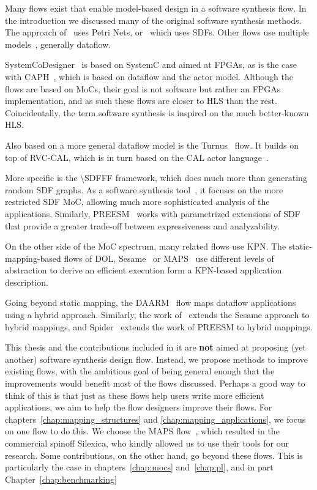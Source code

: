 Many flows exist that enable model-based design in a software synthesis flow.
In the introduction we discussed many of the original software synthesis methods.
The approach of~\cite{lin1998softwaresynthesis} uses Petri Nets, or~\cite{ritz1992softwaresynthesis} which uses \acp{SDF}.
Other flows use multiple models~\cite{bhartacharyya2000softwaresynthesis,pino1995softwaresynthesis,bhattacharyya2012softwaresynthesis}, generally dataflow.

SystemCoDesigner~\cite{haubelt2008systemcodesigner} is based on SystemC and aimed at \acsp{FPGA}, as is the case with CAPH~\cite{serot2013caph}, which is based on dataflow and the actor model.
Although the flows are based on \acp{MoC}, their goal is not software but rather an \acsp{FPGA} implementation, and as such these flows are closer to \ac{HLS} than the rest. 
Coincidentally, the term software synthesis is inspired on the much better-known \ac{HLS}.

Also based on a more general dataflow model is the Turnus~\cite{casale2013turnus} flow.
It builds on top of RVC-CAL, which is in turn based on the CAL actor language~\cite{cal}.

More specific is the \ac{\SDFFF}\cite{sdf3} framework, which does much more than generating random \ac{SDF} graphs.
As a software synthesis tool~\cite{stuijk2010predictable}, it focuses on the more restricted \ac{SDF} \ac{MoC}, allowing much more sophisticated analysis of the applications.
Similarly, PREESM~\cite{pelcat2014preesm} works with parametrized extensions of \ac{SDF}~\cite{desnos2013pimm} that provide a greater trade-off between expressiveness and analyzability.

On the other side of the \ac{MoC} spectrum, many related flows use \ac{KPN}.
The static-mapping-based flows of \ac{DOL}\cite{thiele2007dol}, Sesame~\cite{pimentel2006systematic} or \ac{MAPS}~\cite{maps} use different levels of abstraction to derive an efficient execution form a \ac{KPN}-based application description.

Going beyond static mapping, the DAARM~\cite{weichslgartner2014daarm} flow maps dataflow applications using a hybrid approach.
Similarly, the work of~\cite{quan2015hybrid} extends the Sesame approach to hybrid mappings, and Spider~\cite{heulot2014spider} extends the work of PREESM to hybrid mappings.

This thesis and the contributions included in it are \textbf{not} aimed at proposing (yet another) software synthesis design flow.
Instead, we propose methods to improve existing flows, with the ambitious goal of being general enough that the improvements would benefit most of the flows discussed. 
Perhaps a good way to think of this is that just as these flows help users write more efficient applications, we aim to help the flow designers improve their flows.
For chapters~\ref{chap:mapping_structures} and \ref{chap:mapping_applications}, we focus on one flow to do this.
We choose the \ac{MAPS} flow~\cite{maps}, which resulted in the commercial spinoff Silexica, who kindly allowed us to use their tools for our research.
Some contributions, on the other hand, go beyond these flows. This is particularly the case in chapters~\ref{chap:mocs} and~\ref{chap:pl}, and in part Chapter~\ref{chap:benchmarking} 

